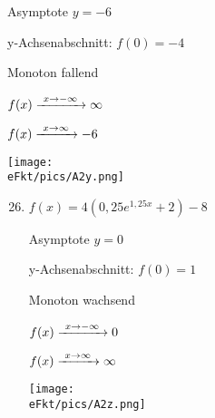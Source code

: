\begin{Answer}[ref=eFktA2]
\begin{minipage}{\textwidth}
\begin{minipage}{0.5\textwidth}
\begin{enumerate}[label=\alph*)]
				Asymptote \(y=-6\)

				y-Achsenabschnitt: \(f(0)=-4\)

				Monoton fallend

				\(f(x)\xrightarrow{\hphantom{\ }x\to-\infty\hphantom{\ }}\infty\)

				\(f(x)\xrightarrow{\hphantom{\ }x\to\infty\hphantom{\ }}-6\)

				\texttt{[image: \\eFkt/pics/A2y.png]}
			\end{enumerate}
		\end{minipage}%
		\begin{minipage}{0.5\textwidth}
			\begin{enumerate}[label=\alph*)]
				\setcounter{enumi}{25}
				\item \(f(x)=4\left( 0,25e^{1,25x}+2\right) -8\)

				Asymptote \(y=0\)

				y-Achsenabschnitt: \(f(0)=1\)

				Monoton wachsend

				\(f(x)\xrightarrow{\hphantom{\ }x\to-\infty\hphantom{\ }}0\)

				\(f(x)\xrightarrow{\hphantom{\ }x\to\infty\hphantom{\ }}\infty\)

				\texttt{[image: \\eFkt/pics/A2z.png]}
			\end{enumerate}
		\end{minipage}%
	\end{minipage}
\end{Answer}